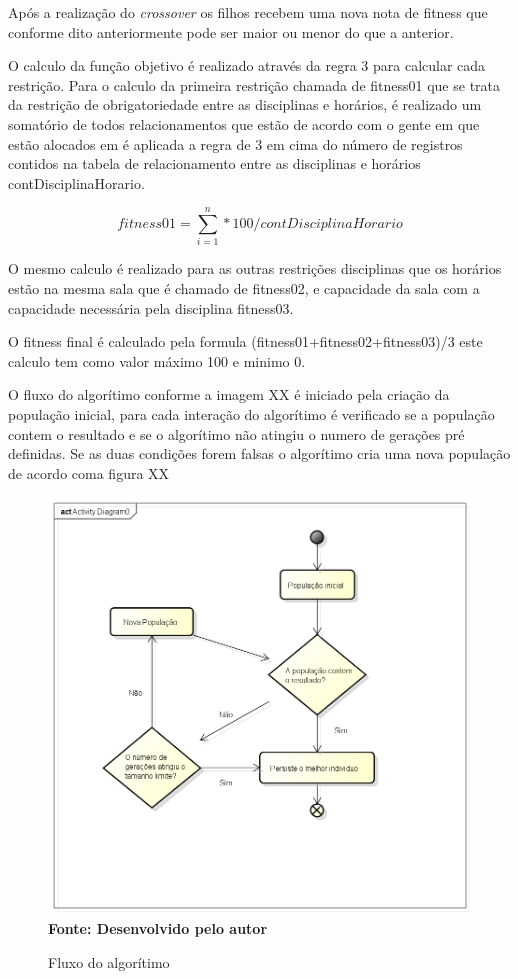 Após a realização do \textit{crossover} os filhos recebem uma nova nota de fitness que conforme dito anteriormente pode ser maior ou menor do que a anterior.



O calculo da função objetivo é realizado através da regra 3 para calcular cada restrição. Para o calculo da primeira restrição chamada de fitness01 que se trata da restrição de obrigatoriedade entre as disciplinas e horários, é realizado um somatório de todos relacionamentos que estão de acordo com o gente em que estão alocados em é aplicada a regra de 3 em cima do número de registros contidos na tabela de relacionamento entre as disciplinas e horários contDisciplinaHorario.


$$fitness01 = \sum_{i=1}^n * 100 / contDisciplinaHorario$$ 

O mesmo calculo é realizado para as outras restrições disciplinas que os horários estão na mesma sala que é chamado de fitness02, e capacidade da sala com a capacidade necessária pela disciplina fitness03.

O fitness final é calculado pela formula (fitness01+fitness02+fitness03)/3 este calculo tem como valor máximo 100 e minimo 0.


O fluxo do algorítimo conforme a imagem XX é iniciado pela criação da população inicial, para cada interação do algorítimo é verificado se a população contem o resultado e se o algorítimo não atingiu o numero de gerações pré definidas. Se as duas condições forem falsas o algorítimo cria uma nova população de acordo coma figura XX

\begin{figure}[!htb]
\caption[Fluxo do algorítimo]{Fluxo do algorítimo}
\label{fig:figura8}
\centering
\includegraphics[scale=0.7]{imagens/fluxoAlgoritimo.png}
\\ \textbf{\footnotesize Fonte: Desenvolvido pelo autor}
\end{figure}

